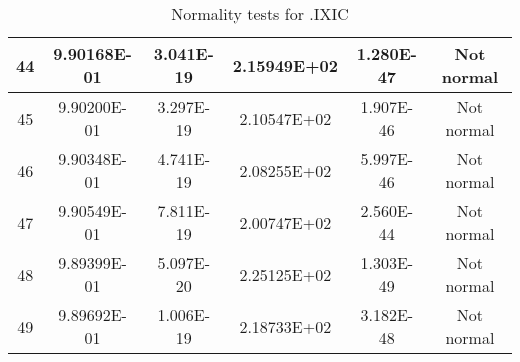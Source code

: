 \begin{table}[h]
\begin{tabular}{|c|c|c|c|c|c|}
		44 & 9.90168E-01 & 3.041E-19 & 2.15949E+02 & 1.280E-47 & Not normal\\\hline
		45 & 9.90200E-01 & 3.297E-19 & 2.10547E+02 & 1.907E-46 & Not normal\\\hline
		46 & 9.90348E-01 & 4.741E-19 & 2.08255E+02 & 5.997E-46 & Not normal\\\hline
		47 & 9.90549E-01 & 7.811E-19 & 2.00747E+02 & 2.560E-44 & Not normal\\\hline
		48 & 9.89399E-01 & 5.097E-20 & 2.25125E+02 & 1.303E-49 & Not normal\\\hline
		49 & 9.89692E-01 & 1.006E-19 & 2.18733E+02 & 3.182E-48 & Not normal\\\hline
	\end{tabular}
	\caption{Normality tests for .IXIC}
	\label{tab:normality_tests_IXIC}
\end{table}
